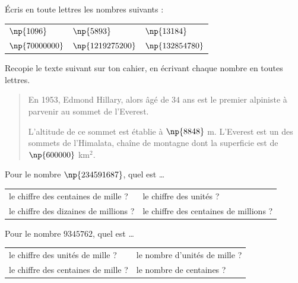 \documentclass[a4paper,10pt]{report}
\begin{document}
\begin{ex}
Écris en toute lettres les nombres suivants :

\begin{enumerate}
\begin{tabular}{m{5cm}m{5cm}m{5cm}}
\item $\np{1096}$&
\item $\np{5893}$&
\item $\np{13184}$\\
\item $\np{70000000}$&
\item $\np{1219275200}$&
\item $\np{132854780}$\\
\end{tabular}
\end{enumerate}
\end{ex}

\begin{ex}
Recopie le texte suivant sur ton cahier, en écrivant chaque nombre en toutes lettres.

\begin{quotation}
En 1953, Edmond Hillary, alors âgé de $34$ ans est le premier alpiniste à parvenir au sommet de l'Everest.

L'altitude de ce sommet est établie à $\np{8 848}$ m. L'Everest est un des sommets de l'Himalata, chaîne de montagne dont la superficie est de $\np{600000}$ km$^2$.
\end{quotation}
\end{ex}

\begin{ex}
Pour le nombre $\np{234591687}$, quel est \dots

\begin{enumerate}
\begin{tabular}{m{7cm}m{7cm}}
\item le chiffre des centaines de mille ?&
\item le chiffre des unités ?\\
\item le chiffre des dizaines de millions ?&
\item le chiffre des centaines de millions ?\\
\end{tabular}
\end{enumerate}
\end{ex}

\begin{ex}
Pour le nombre $9345762$, quel est \dots

\begin{enumerate}
\begin{tabular}{m{7cm}m{7cm}}
\item le chiffre des unités de mille ?&
\item le nombre d'unités de mille ?\\
\item le chiffre des centaines de mille ?&
\item le nombre de centaines ?\\
\end{tabular}
\end{enumerate}
\end{ex}
\end{document}
